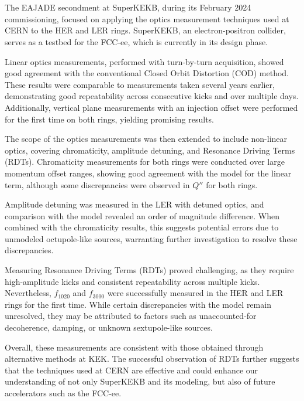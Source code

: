 \FloatBarrier
\section{}

The EAJADE secondment at SuperKEKB, during its February 2024 commissioning, focused on applying the
optics measurement techniques used at CERN to the HER and LER rings. SuperKEKB, an electron-positron
collider, serves as a testbed for the FCC-ee, which is currently in its design phase.

Linear optics measurements, performed with turn-by-turn acquisition, showed good agreement with the
conventional Closed Orbit Distortion (COD) method. These results were comparable to measurements
taken several years earlier, demonstrating good repeatability across consecutive kicks and over
multiple days. Additionally, vertical plane measurements with an injection offset were performed for
the first time on both rings, yielding promising results.

The scope of the optics measurements was then extended to include non-linear optics, covering
chromaticity, amplitude detuning, and Resonance Driving Terms (RDTs). Chromaticity measurements for
both rings were conducted over large momentum offset ranges, showing good agreement with the model
for the linear term, although some discrepancies were observed in $Q''$ for both rings.

Amplitude detuning was measured in the LER with detuned optics, and comparison with the model
revealed an order of magnitude difference. When combined with the chromaticity results, this
suggests potential errors due to unmodeled octupole-like sources, warranting further investigation
to resolve these discrepancies.

Measuring Resonance Driving Terms (RDTs) proved challenging, as they require high-amplitude kicks
and consistent repeatability across multiple kicks. Nevertheless, $f_{1020}$ and $f_{3000}$ were
successfully measured in the HER and LER rings for the first time. While certain discrepancies with
the model remain unresolved, they may be attributed to factors such as unaccounted-for decoherence,
damping, or unknown sextupole-like sources.

Overall, these measurements are consistent with those obtained through alternative methods at KEK.
The successful observation of RDTs further suggests that the techniques used at CERN are effective
and could enhance our understanding of not only SuperKEKB and its modeling, but also of future
accelerators such as the FCC-ee.
